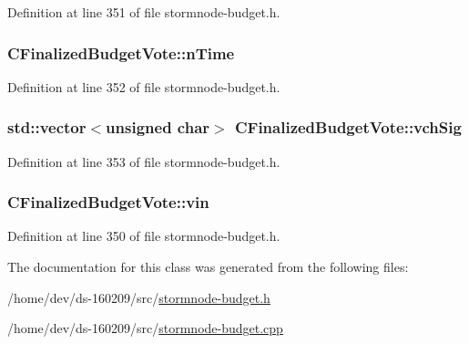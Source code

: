 Definition at line 351 of file stormnode-\/budget.\+h.

\hypertarget{class_c_finalized_budget_vote_abe49a15e472fdaaab521ae83bb9f6e42}{}
\subsubsection[{n\+Time}]{ C\+Finalized\+Budget\+Vote\+::n\+Time}\label{class_c_finalized_budget_vote_abe49a15e472fdaaab521ae83bb9f6e42}


Definition at line 352 of file stormnode-\/budget.\+h.

\hypertarget{class_c_finalized_budget_vote_a8068f2ad5defbc62be4221ecacef011f}{}
\subsubsection[{vch\+Sig}]{\setlength{\rightskip}{0pt plus 5cm}std\+::vector$<$unsigned char$>$ C\+Finalized\+Budget\+Vote\+::vch\+Sig}\label{class_c_finalized_budget_vote_a8068f2ad5defbc62be4221ecacef011f}


Definition at line 353 of file stormnode-\/budget.\+h.

\hypertarget{class_c_finalized_budget_vote_adcfb3d5520f8374deac4f3b4f6eb24cc}{}
\subsubsection[{vin}]{ C\+Finalized\+Budget\+Vote\+::vin}\label{class_c_finalized_budget_vote_adcfb3d5520f8374deac4f3b4f6eb24cc}


Definition at line 350 of file stormnode-\/budget.\+h.



The documentation for this class was generated from the following files\+:\begin{DoxyCompactItemize}
\item 
/home/dev/ds-\/160209/src/\hyperlink{stormnode-budget_8h}{stormnode-\/budget.\+h}\item 
/home/dev/ds-\/160209/src/\hyperlink{stormnode-budget_8cpp}{stormnode-\/budget.\+cpp}\end{DoxyCompactItemize}
